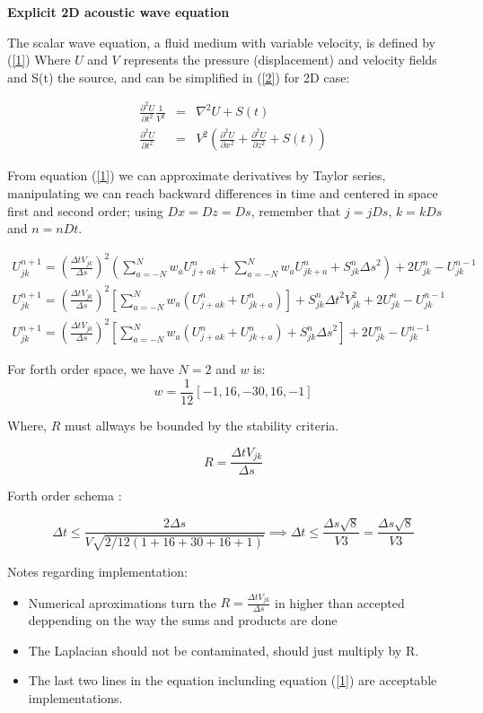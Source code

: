 \documentclass[legalpaper, 12pt]{article}
\begin{document}
\textbf{Explicit 2D acoustic wave equation }

The scalar wave equation, a fluid medium with variable velocity, is defined by (\ref{1}) Where $U$ and $V$ represents the pressure (displacement) and velocity fields and S(t) the source, and can be simplified in (\ref{2}) for 2D case:

\begin{eqnarray}
\frac{\partial^2 U}{\partial t^2} \frac{1}{V^2} &=& \nabla^2 U + S(t) \label{1} \\
\frac{\partial^2 U}{\partial t^2} &=& V^2 \left( \frac{\partial^2 U}{\partial x^2}+ \frac{\partial^2 U}{\partial z^2} +S(t) \right)
\label{2}
\end{eqnarray}

From equation (\ref{1}) we can approximate derivatives by Taylor series, manipulating we can reach backward differences in time and centered in space first and second order; using $Dx=Dz=Ds$, remember that $j=jDs$, $k=kDs$ and $n=nDt$.

\begin{multline}
U_{jk}^{n+1}  =  \left( \frac{\Delta t  V_{jk} }{\Delta s} \right) ^2 \left(  \sum_{a=-N}^N w_a U_{j+a k}^n + \sum_{a=-N}^N w_a U_{j k+a}^n +S_{jk}^n {\Delta s}^2 \right) + 2 U_{jk}^{n} - U_{jk}^{n-1}  \\
U_{jk}^{n+1}  =  \left( \frac{\Delta t  V_{jk}}{\Delta s} \right) ^2   \left[ \sum_{a=-N}^N  w_a \left( U_{j+a k}^n + U_{j k+a}^n \right) \right] + S_{jk}^n {\Delta t}^2 V_{jk}^2 + 2 U_{jk}^{n} - U_{jk}^{n-1} \\
U_{jk}^{n+1}  =  \left( \frac{\Delta t  V_{jk}}{\Delta s} \right) ^2  \left[ \sum_{a=-N}^N  w_a \left( U_{j+a k}^n + U_{j k+a}^n \right) + S_{jk}^n {\Delta s}^2\right] + 2 U_{jk}^{n} - U_{jk}^{n-1} \label{3}
\end{multline}

For forth order space, we have $N=2$ and $w$ is:
$$ w = \frac{1}{12} [-1, 16, -30, 16, -1] $$

Where, $ R $ must allways be bounded by the stability criteria.

\[ R = \frac{\Delta t  V_{jk}}{\Delta s} \]

Forth order schema :

$$ \Delta t \leq \frac{2 \Delta s}{ V \sqrt{2/12(1+16+30+16+1)}} \implies \Delta t \leq \frac{ \Delta s \sqrt{8}}{ V 3} = \frac{ \Delta s \sqrt{8}}{ V 3}$$

Notes regarding implementation:

\begin{itemize}
\item Numerical aproximations turn the $R = \frac{\Delta t  V_{jk}}{\Delta s}$ in higher than accepted deppending on the way the sums and products are done
\item The Laplacian should not be contaminated, should just multiply by R.
\item The last two lines in the equation inclunding equation (\ref{1}) are acceptable implementations.
\end{itemize}
 
\end{document}
